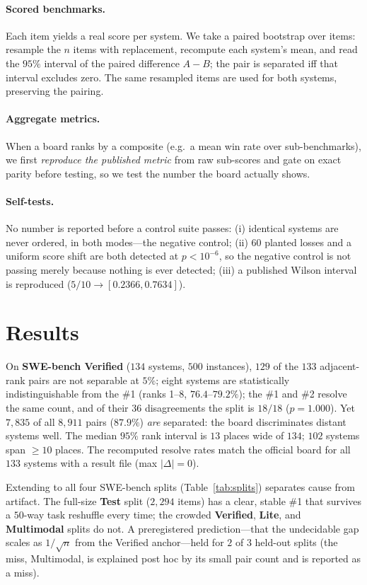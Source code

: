 \documentclass{article}
\begin{document}
\paragraph{Scored benchmarks.} Each item yields a real score per system. We take a paired bootstrap
over items: resample the $n$ items with replacement, recompute each system's mean, and read the $95\%$
interval of the paired difference $A-B$; the pair is separated iff that interval excludes zero. The
same resampled items are used for both systems, preserving the pairing.

\paragraph{Aggregate metrics.} When a board ranks by a composite (e.g.\ a mean win rate over
sub-benchmarks), we first \emph{reproduce the published metric} from raw sub-scores and gate on exact
parity before testing, so we test the number the board actually shows.

\paragraph{Self-tests.} No number is reported before a control suite passes: (i) identical systems are
never ordered, in both modes---the negative control; (ii) $60$ planted losses and a uniform score
shift are both detected at $p<10^{-6}$, so the negative control is not passing merely because nothing
is ever detected; (iii) a published Wilson interval is reproduced ($5/10 \to [0.2366, 0.7634]$).

\section{Results}
\label{sec:results}
On \textbf{SWE-bench Verified} ($134$ systems, $500$ instances), $129$ of the $133$ adjacent-rank pairs
are not separable at $5\%$; eight systems are statistically indistinguishable from the \#1 (ranks
1--8, $76.4$--$79.2\%$); the \#1 and \#2 resolve the same count, and of their $36$ disagreements the
split is $18/18$ ($p=1.000$). Yet $7{,}835$ of all $8{,}911$ pairs ($87.9\%$) \emph{are} separated: the
board discriminates distant systems well. The median $95\%$ rank interval is $13$ places wide of $134$;
$102$ systems span $\ge 10$ places. The recomputed resolve rates match the official board for all $133$
systems with a result file (max $|\Delta|=0$).

Extending to all four SWE-bench splits (Table~\ref{tab:splits}) separates cause from artifact. The
full-size \textbf{Test} split ($2{,}294$ items) has a clear, stable \#1 that survives a $50$-way task
reshuffle every time; the crowded \textbf{Verified}, \textbf{Lite}, and \textbf{Multimodal} splits do
not. A preregistered prediction---that the undecidable gap scales as $1/\sqrt{n}$ from the Verified
anchor---held for $2$ of $3$ held-out splits (the miss, Multimodal, is explained post hoc by its small
pair count and is reported as a miss).
\end{document}
